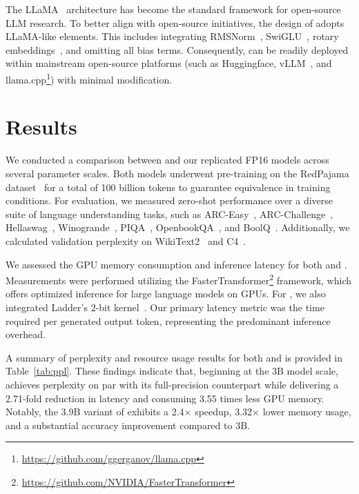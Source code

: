 The LLaMA~\cite{llama, llama2} architecture has become the standard framework for open-source LLM research. To better align with open-source initiatives, the design of  adopts LLaMA-like elements. This includes integrating RMSNorm~\cite{rmsnorm}, SwiGLU~\cite{swiglu}, rotary embeddings~\cite{rope}, and omitting all bias terms. Consequently,  can be readily deployed within mainstream open-source platforms (such as Huggingface, vLLM~\cite{vllm}, and llama.cpp\footnote{\url{https://github.com/ggerganov/llama.cpp}}) with minimal modification. 

\section{Results}

We conducted a comparison between  and our replicated FP16  models across several parameter scales. Both models underwent pre-training on the RedPajama dataset~\cite{redpajama} for a total of 100 billion tokens to guarantee equivalence in training conditions. For evaluation, we measured zero-shot performance over a diverse suite of language understanding tasks, such as ARC-Easy~\cite{arc}, ARC-Challenge~\cite{arc}, Hellaswag~\cite{hellaswag}, Winogrande~\cite{winoGrande}, PIQA~\cite{piqa}, OpenbookQA~\cite{openbookqa}, and BoolQ~\cite{boolq}. Additionally, we calculated validation perplexity on WikiText2~\cite{wikitext2} and C4~\cite{c4}.

We assessed the GPU memory consumption and inference latency for both  and . Measurements were performed utilizing the FasterTransformer\footnote{\url{https://github.com/NVIDIA/FasterTransformer}} framework, which offers optimized inference for large language models on GPUs. For , we also integrated Ladder’s 2-bit kernel~\cite{ladder}. Our primary latency metric was the time required per generated output token, representing the predominant inference overhead.

A summary of perplexity and resource usage results for both  and  is provided in Table~\ref{tab:ppl}. These findings indicate that, beginning at the 3B model scale,  achieves perplexity on par with its full-precision  counterpart while delivering a 2.71-fold reduction in latency and consuming 3.55 times less GPU memory. Notably, the 3.9B variant of  exhibits a 2.4$\times$ speedup, 3.32$\times$ lower memory usage, and a substantial accuracy improvement compared to  3B.

